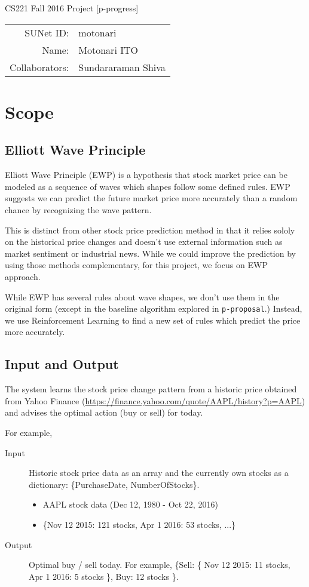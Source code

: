 \documentclass[12pt]{article}
\begin{document}
\begin{center}
{\Large CS221 Fall 2016 Project [p-progress]}

\begin{tabular}{rl}
SUNet ID: & motonari \\
Name: & Motonari ITO \\
Collaborators: & Sundararaman Shiva
\end{tabular}
\end{center}

\section{Scope}

\subsection{Elliott Wave Principle}

Elliott Wave Principle (EWP) is a hypothesis that stock market price
can be modeled as a sequence of waves which shapes follow some defined
rules. EWP suggests we can predict the future market price more
accurately than a random chance by recognizing the wave pattern.

This is distinct from other stock price prediction method in that it
relies sololy on the historical price changes and doesn't use external
information such as market sentiment or industrial news. While we
could improve the prediction by using those methods complementary, for
this project, we focus on EWP approach.

While EWP has several rules about wave shapes, we don't use them in
the original form (except in the baseline algorithm explored in
\verb|p-proposal|.) Instead, we use Reinforcement Learning to find a
new set of rules which predict the price more accurately.

\subsection{Input and Output}

The system learns the stock price change pattern from a historic price
obtained from Yahoo Finance
(\url{https://finance.yahoo.com/quote/AAPL/history?p=AAPL}) and
advises the optimal action (buy or sell) for today.

For example,
\begin{description}
\item[Input] Historic stock price data as an array and the currently
  own stocks as a dictionary: \{PurchaseDate, NumberOfStocks\}.
  
  \begin{itemize}
  \item AAPL stock data (Dec 12, 1980 - Oct 22, 2016)
  \item \{Nov 12 2015: 121 stocks, Apr 1 2016: 53 stocks, ...\}
  \end{itemize}
\item[Output]
  Optimal buy / sell today. For example, \{Sell: \{ Nov 12 2015: 11 stocks, Apr 1 2016: 5 stocks \}, Buy: 12 stocks \}.
\end{description}
\end{document}
